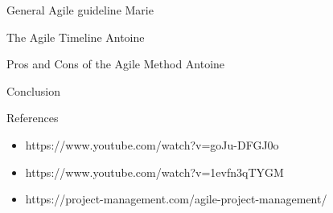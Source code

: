 \documentclass[10pt]{beamer}
\begin{document}
\begin{frame}{General Agile guideline}
    Marie
\end{frame}

\begin{frame}{The Agile Timeline}
    Antoine
\end{frame}

\begin{frame}{Pros and Cons of the Agile Method}
    Antoine
\end{frame}

\begin{frame}{Conclusion}
  
\end{frame}

\begin{frame}{References}

  \begin{itemize}
    \item https://www.youtube.com/watch?v=goJu-DFGJ0o
    \item https://www.youtube.com/watch?v=1evfn3qTYGM
    \item https://project-management.com/agile-project-management/
  \end{itemize}
  
\end{frame}
\end{document}
